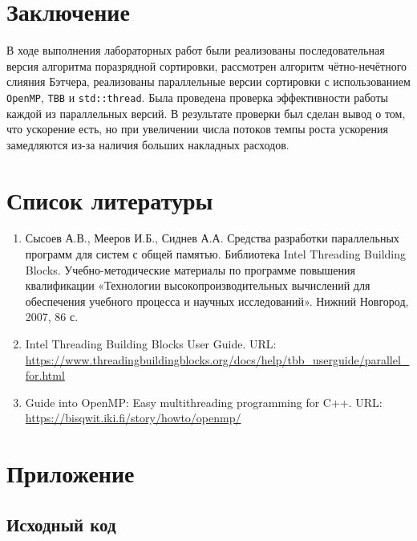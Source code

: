 \documentclass{report}
\begin{document}
    \section*{Заключение}
    В ходе выполнения лабораторных работ были реализованы последовательная версия алгоритма поразрядной сортировки, рассмотрен алгоритм чётно-нечётного слияния Бэтчера, реализованы параллельные версии сортировки с использованием \verb|OpenMP|, \verb|TBB| и \verb|std::thread|. Была проведена проверка эффективности работы каждой из параллельных версий. В результате проверки был сделан вывод о том, что ускорение есть, но при увеличении числа потоков темпы роста ускорения замедляются из-за наличия больших накладных расходов.

    \newpage
    \section*{Список литературы}
    \begin{enumerate}
        \item Сысоев А.В., Мееров И.Б., Сиднев А.А. Средства разработки параллельных программ для систем с общей памятью. Библиотека Intel Threading Building Blocks. Учебно-методические материалы по программе повышения квалификации «Технологии высокопроизводительных вычислений для обеспечения учебного процесса и научных исследований». Нижний Новгород, 2007, 86 с.
        \item Intel Threading Building Blocks User Guide. URL: \url{https://www.threadingbuildingblocks.org/docs/help/tbb_userguide/parallel_for.html}
        \item Guide into OpenMP: Easy multithreading programming for C++. URL: \url{https://bisqwit.iki.fi/story/howto/openmp/}
    \end{enumerate}

    \newpage
    \section*{Приложение}

    \subsection*{Исходный код}
\end{document}
